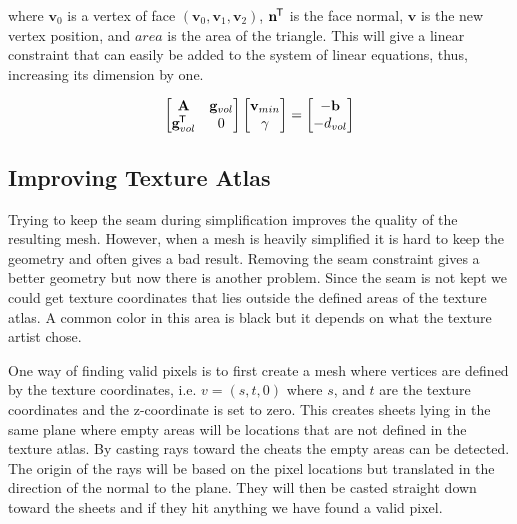 where \(\mathbf{v}_0\) is a vertex of face \((\mathbf{v}_0, \mathbf{v}_1, \mathbf{v}_2)\), \(\mathbf{n}^{\mkern-1.5mu\mathsf{T}}\) is the face normal, \(\mathbf{v}\) is the new vertex position, and \(area\) is the area of the triangle. This will give a linear constraint that can easily be added to the system of linear equations, thus, increasing its dimension by one.

\begin{equation} \label{eq:volume_constraint}
  \begin{bmatrix}
    \mathbf{A}                & \mathbf{g}_{vol} \\
     \mathbf{g}_{vol}^{\mkern-1.5mu\mathsf{T}} & 0
  \end{bmatrix}
  \begin{bmatrix}
    \mathbf{v}_{min} \\
    \gamma
  \end{bmatrix}
  =
  \begin{bmatrix}
    -\mathbf{b} \\
    -d_{vol}
  \end{bmatrix}
\end{equation}


\subsection{Improving Texture Atlas}
Trying to keep the seam during simplification improves the quality of the resulting mesh. However, when a mesh is heavily simplified it is hard to keep the geometry and often gives a bad result. Removing the seam constraint gives a better geometry but now there is another problem. Since the seam is not kept we could get texture coordinates that lies outside the defined areas of the texture atlas. A common color in this area is black but it depends on what the texture artist chose.

One way of finding valid pixels is to first create a mesh where vertices are defined by the texture coordinates, i.e. $v = (s, t, 0)$ where $s$, and $t$ are the texture coordinates and the z-coordinate is set to zero. This creates sheets lying in the same plane where empty areas will be locations that are not defined in the texture atlas. By casting rays toward the cheats the empty areas can be detected. The origin of the rays will be based on the pixel locations but translated in the direction of the normal to the plane. They will then be casted straight down toward the sheets and if they hit anything we have found a valid pixel.


